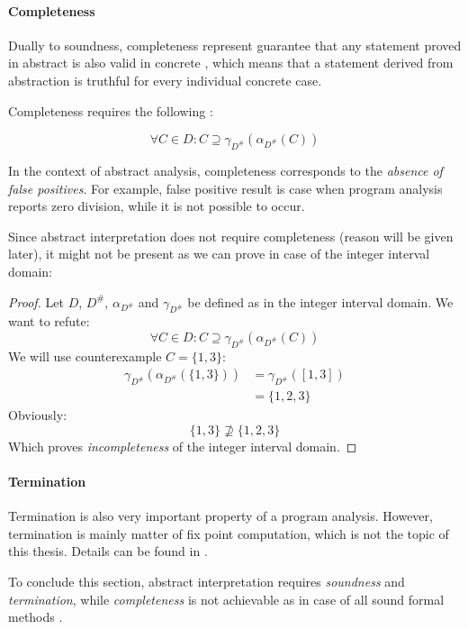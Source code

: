 \documentclass[12pt,oneside]{fithesis2}
\theoremstyle{definition}
\begin{document}
\paragraph{Completeness}
Dually to soundness, completeness represent guarantee that any statement proved in abstract is also valid in concrete \cite{mine-AIAA10}, which means that a statement derived from abstraction is truthful for every individual concrete case.

Completeness requires the following \cite{mine-AIAA10}:

\[
  \forall C \in D: C \supseteq \gamma_{D^\#}(\alpha_{D^\#}(C))
\]

In the context of abstract analysis, completeness corresponds to the \textit{absence of false positives}. For example, false positive result is case when program analysis reports zero division, while it is not possible to occur.

Since abstract interpretation does not require completeness (reason will be given later), it might not be present as we can prove in case of the integer interval domain:

\begin{proof}
  Let $D$, $D^\#$, $\alpha_{D^\#}$ and $\gamma_{D^\#}$ be defined as in the integer interval domain. We want to refute:
  \[
    \forall C \in D: C \supseteq \gamma_{D^\#}(\alpha_{D^\#}(C))
  \]
  We will use counterexample $C = \{1, 3\}$:
  \begin{align*}
    \gamma_{D^\#}(\alpha_{D^\#}(\{1, 3\})) &= \gamma_{D^\#}([1, 3])\\
    &= \{1, 2, 3\}
  \end{align*}
  Obviously:
  \[
    \{1, 3\} \not\supseteq \{1, 2, 3\}
  \]
  Which proves \textit{incompleteness} of the integer interval domain.
\end{proof}

\paragraph{Termination} Termination is also very important property of a program analysis. However, termination is mainly matter of fix point computation, which is not the topic of this thesis. Details can be found in \cite{CousotCousot79-1}.

To conclude this section, abstract interpretation requires \textit{soundness} and \textit{termination}, while \textit{completeness} is not achievable as in case of all sound formal methods \cite{CousotEtAl06-ASIAN}.
\end{document}
